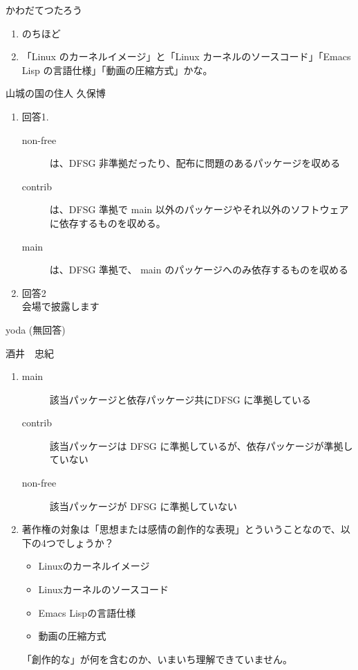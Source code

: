 \documentclass[mingoth,a4paper]{jsarticle}
\begin{document}
\begin{prework}{ かわだてつたろう }
  \begin{enumerate}
  \item のちほど
  \item 「Linux のカーネルイメージ」と「Linux カーネルのソースコード」「Emacs Lisp の言語仕様」「動画の圧縮方式」かな。
  \end{enumerate}
\end{prework}

\begin{prework}{ 山城の国の住人 久保博 }
  \begin{enumerate}
  \item 回答1.
    \begin{description}
    \item [non-free]は、DFSG 非準拠だったり、配布に問題のあるパッケージを収める
    \item [contrib]は、DFSG 準拠で main 以外のパッケージやそれ以外のソフトウェアに依存するものを収める。
    \item [main]は、DFSG 準拠で、 main のパッケージへのみ依存するものを収める
    \end{description}
  \item 回答2\\
    会場で披露します
  \end{enumerate}
\end{prework}

\begin{prework}{ yoda }
  (無回答)
\end{prework}

\begin{prework}{ 酒井　忠紀 }
  \begin{enumerate}
  \item
    \begin{description}
    \item [main] 該当パッケージと依存パッケージ共にDFSG に準拠している
    \item [contrib] 該当パッケージは DFSG に準拠しているが、依存パッケージが準拠していない
    \item [non-free] 該当パッケージが DFSG に準拠していない
    \end{description}
  \item 著作権の対象は「思想または感情の創作的な表現」とういうことなので、以下の4つでしょうか？
    \begin{itemize}
    \item Linuxのカーネルイメージ
    \item Linuxカーネルのソースコード
    \item Emacs Lispの言語仕様
    \item 動画の圧縮方式
    \end{itemize}
        「創作的な」が何を含むのか、いまいち理解できていません。
  \end{enumerate}
\end{prework}
\end{document}
